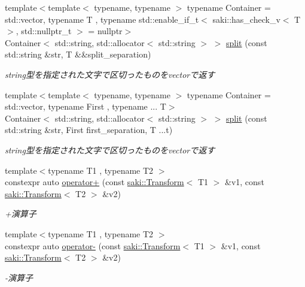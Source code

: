 \begin{DoxyCompactItemize}
{\footnotesize template$<$template$<$ typename, typename $>$ typename Container = std\+::vector, typename T , typename std\+::enable\+\_\+if\+\_\+t$<$ saki\+::has\+\_\+check\+\_\+v$<$ T $>$, std\+::nullptr\+\_\+t $>$  = nullptr$>$ }\\Container$<$ std\+::string, std\+::allocator$<$ std\+::string $>$ $>$ \mbox{\hyperlink{namespacesaki_ad15185db28f6e77d65411ca83f64f5bb}{split}} (const std\+::string \&str, T \&\&split\+\_\+separation)
\begin{DoxyCompactList}\small\item\em string型を指定された文字で区切ったものをvectorで返す \end{DoxyCompactList}\item 
{\footnotesize template$<$template$<$ typename, typename $>$ typename Container = std\+::vector, typename First , typename ... T$>$ }\\Container$<$ std\+::string, std\+::allocator$<$ std\+::string $>$ $>$ \mbox{\hyperlink{namespacesaki_ac1464436ac78ade2ba14371e2efe1fd2}{split}} (const std\+::string \&str, First first\+\_\+separation, T ...t)
\begin{DoxyCompactList}\small\item\em string型を指定された文字で区切ったものをvectorで返す \end{DoxyCompactList}\item 
{\footnotesize template$<$typename T1 , typename T2 $>$ }\\constexpr auto \mbox{\hyperlink{namespacesaki_afaf794508bac90671fcdf32ce337f966}{operator+}} (const \mbox{\hyperlink{classsaki_1_1_transform}{saki\+::\+Transform}}$<$ T1 $>$ \&v1, const \mbox{\hyperlink{classsaki_1_1_transform}{saki\+::\+Transform}}$<$ T2 $>$ \&v2)
\begin{DoxyCompactList}\small\item\em +演算子 \end{DoxyCompactList}\item 
{\footnotesize template$<$typename T1 , typename T2 $>$ }\\constexpr auto \mbox{\hyperlink{namespacesaki_a258f0124a288745a25dc806ba86fa356}{operator-\/}} (const \mbox{\hyperlink{classsaki_1_1_transform}{saki\+::\+Transform}}$<$ T1 $>$ \&v1, const \mbox{\hyperlink{classsaki_1_1_transform}{saki\+::\+Transform}}$<$ T2 $>$ \&v2)
\begin{DoxyCompactList}\small\item\em -\/演算子 \end{DoxyCompactList}\item 

\end{DoxyCompactItemize}
